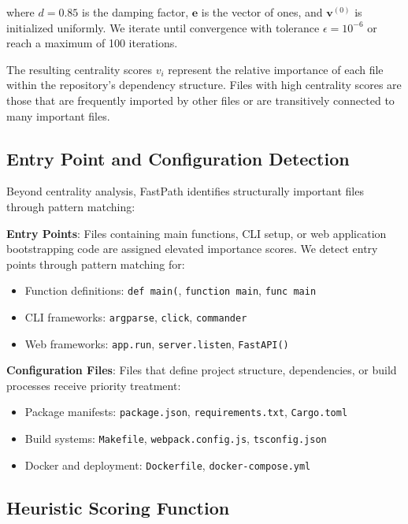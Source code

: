 \documentclass[conference]{IEEEtran}
\begin{document}
where $d = 0.85$ is the damping factor, $\mathbf{e}$ is the vector of ones, and $\mathbf{v}^{(0)}$ is initialized uniformly. We iterate until convergence with tolerance $\epsilon = 10^{-6}$ or reach a maximum of 100 iterations.

The resulting centrality scores $v_i$ represent the relative importance of each file within the repository's dependency structure. Files with high centrality scores are those that are frequently imported by other files or are transitively connected to many important files.

\subsection{Entry Point and Configuration Detection}

Beyond centrality analysis, FastPath identifies structurally important files through pattern matching:

\textbf{Entry Points}: Files containing main functions, CLI setup, or web application bootstrapping code are assigned elevated importance scores. We detect entry points through pattern matching for:
\begin{itemize}
\item Function definitions: \texttt{def main(}, \texttt{function main}, \texttt{func main}
\item CLI frameworks: \texttt{argparse}, \texttt{click}, \texttt{commander}
\item Web frameworks: \texttt{app.run}, \texttt{server.listen}, \texttt{FastAPI()}
\end{itemize}

\textbf{Configuration Files}: Files that define project structure, dependencies, or build processes receive priority treatment:
\begin{itemize}
\item Package manifests: \texttt{package.json}, \texttt{requirements.txt}, \texttt{Cargo.toml}
\item Build systems: \texttt{Makefile}, \texttt{webpack.config.js}, \texttt{tsconfig.json}
\item Docker and deployment: \texttt{Dockerfile}, \texttt{docker-compose.yml}
\end{itemize}

\subsection{Heuristic Scoring Function}
\end{document}
